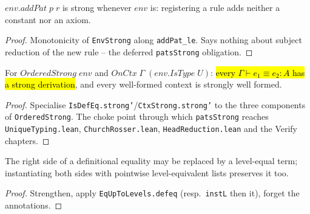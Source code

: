 \begin{lemma}
\label{thm:ontypes-addpat}
\leanok
{}

 $env.addPat\;p\;r$ is strong whenever $env$ is: registering a rule adds neither
a constant nor an axiom.
\end{lemma}
\begin{proof}
\leanok
{} Monotonicity of \texttt{EnvStrong} along \texttt{addPat\_le}.
 Says nothing about subject reduction of the new rule -- the deferred
\texttt{patsStrong} obligation.
\end{proof}

\begin{theorem}
\label{thm:isdefeq-strong}
\leanok
{}

 For $OrderedStrong\;env$ and $OnCtx\;\Gamma\;(env.IsType\;U)$: \hl{every
$\Gamma\vdash e_1\equiv e_2:A$ has a strong derivation}, and every well-formed context is
strongly well formed.
\end{theorem}
\begin{proof}
\leanok
{} Specialise \texttt{IsDefEq.strong'}/\texttt{CtxStrong.strong'} to the three
components of \texttt{OrderedStrong}.
 The choke point through which \stSorry{} \texttt{patsStrong} reaches
\texttt{UniqueTyping.lean}, \texttt{ChurchRosser.lean}, \texttt{HeadReduction.lean} and the
Verify chapters.
\end{proof}

\begin{lemma}
\label{fam:isdefeq-levels}
\leanok
{}

 The right side of a definitional equality may be replaced by a level-equal
term; instantiating both sides with pointwise level-equivalent lists preserves it too.
\end{lemma}
\begin{proof}
\leanok
{} Strengthen, apply \texttt{EqUpToLevels.defeq} (resp.\ \texttt{instL} then it),
forget the annotations.
\end{proof}

